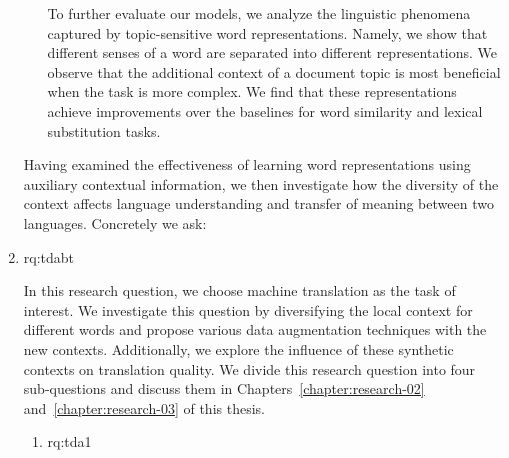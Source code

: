 \begin{enumerate}[label=\textbf{Research Question \arabic*:},ref={RQ\arabic*},wide = 0pt,resume]
\begin{enumerate}[label=\textbf{RQ1.\arabic*},wide = 0pt, leftmargin=2em]
\medskip

To further evaluate our models, we analyze the linguistic phenomena captured by topic-sensitive word representations. 
Namely, we show that different senses of a word are separated into different representations. 
We observe that the additional context of a document topic is most beneficial when the task is more complex.
We find that these representations achieve improvements over the baselines for word similarity and lexical substitution tasks. 

\end{enumerate}

Having examined the effectiveness of learning word representations using auxiliary contextual information, we then investigate how the diversity of the context affects language understanding and transfer of meaning between two languages. Concretely we ask:

\item \acl{rq:tdabt}  \label{rq:tdabt}

In this research question, we choose machine translation as the task of interest.
We investigate this question by diversifying the local context for different words and propose various data augmentation techniques with the new contexts. 
Additionally, we explore the influence of these synthetic contexts on translation quality. 
We divide this research question into four sub-questions and discuss them in Chapters~\ref{chapter:research-02} and~\ref{chapter:research-03} of this thesis. 

\begin{enumerate}[label=\textbf{RQ2.\arabic*},wide = 0pt, leftmargin=2em]
\setlength\itemsep{1em}
\item \acl{rq:tda1} \label{rq:tda1}

\medskip


\end{enumerate}
\end{enumerate}
